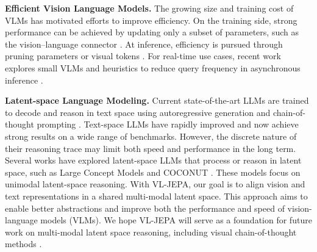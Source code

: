 \textbf{Efficient Vision Language Models.} The growing size and training cost of VLMs has motivated efforts to improve efficiency. On the training side, strong performance can be achieved by updating only a subset of parameters, such as the vision–language connector \citep{tsimpoukelli2021multimodal,alayrac2022flamingo,vallaeys2024improved,shukor2023ep,koh2023groundingfromage,merullo2023linearlylimber,dai2023instructblip}. At inference, efficiency is pursued through pruning parameters or visual tokens \citep{cao2023pumer,shukor2024skipping,vasu2025fastvlm}. For real-time use cases, recent work explores small VLMs \citep{yao2024minicpm,marafioti2025smolvlm} and heuristics to reduce query frequency in asynchronous inference \citep{shukor2025smolvla}.

{
\textbf{Latent-space Language Modeling.}
Current state-of-the-art LLMs are trained to decode and reason in text space using autoregressive generation and chain-of-thought prompting \citep{wei2023chainofthoughtpromptingelicitsreasoning}.
Text-space LLMs have rapidly improved and now achieve strong results on a wide range of benchmarks.
However, the discrete nature of their reasoning trace may limit both speed and performance in the long term.
Several works have explored latent-space LLMs that process or reason in latent space, such as Large Concept Models \citep{lcmteam2024largeconceptmodelslanguage} and COCONUT \citep{hao2025traininglargelanguagemodels}.
These models focus on unimodal latent-space reasoning.
With VL-JEPA, our goal is to align vision and text representations in a shared multi-modal latent space.
This approach aims to enable better abstractions and improve both the performance and speed of vision-language models (VLMs).
We hope VL-JEPA will serve as a foundation for future work on multi-modal latent space reasoning, including visual chain-of-thought methods \citep{li2025imaginereasoningspacemultimodal}.
}
